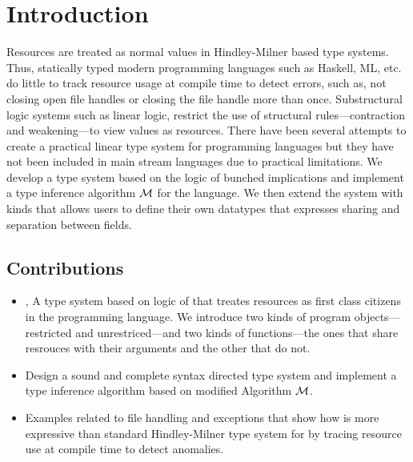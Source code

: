 \chapter{Introduction}

Resources are treated as normal values in Hindley-Milner based type systems. Thus, statically typed modern programming languages such as
Haskell, ML, etc. do little to track resource usage at compile time to detect errors, such as, not closing open file handles
or closing the file handle more than once. Substructural logic systems such as linear logic, restrict the use of
structural rules---contraction and weakening---to view values as resources. There have been several attempts to create a practical linear
type system for programming languages but they have not been included in main stream languages due to practical limitations.
We develop a type system based on the logic of bunched implications and implement a type inference algorithm $\mathcal{M}$ for the language.
We then extend the system with kinds that allows users to define their own datatypes that expresses sharing and separation between
fields.

\section{Contributions}
\begin{itemize}
\item \qub{}, A type system based on logic of \BI{} that treates resources as first class citizens in the programming language.
  We introduce two kinds of program objects---restricted and unrestriced---and two kinds of functions---the ones that share resrouces with
  their arguments and the other that do not.
\item Design a sound and complete syntax directed type system and implement a type inference algorithm based on modified Algorithm $\mathcal{M}$.
\item Examples related to file handling and exceptions that show how \qub{} is more expressive than standard
  Hindley-Milner type system for by tracing resource use at compile time to detect anomalies.
\end{itemize}